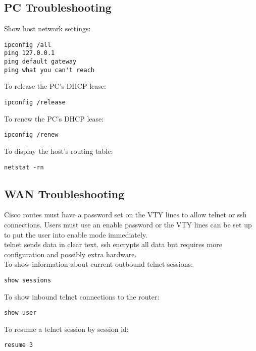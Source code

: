 \subsection{PC Troubleshooting}

Show host network settings:

\begin{verbatim}
ipconfig /all
ping 127.0.0.1
ping default gateway
ping what you can't reach
\end{verbatim}

To release the PC's DHCP lease:

\begin{verbatim}
ipconfig /release
\end{verbatim}

To renew the PC's DHCP lease:

\begin{verbatim}
ipconfig /renew
\end{verbatim}

To display the host's routing table:

\begin{verbatim}
netstat -rn
\end{verbatim}

\subsection{WAN Troubleshooting}

Cisco routes must have a password set on the VTY lines to allow telnet or
ssh connections. Users must use an enable password or the VTY lines can be
set up to put the user into enable mode immediately.\\

telnet sends data in clear text. ssh encrypts all data but requires more
configuration and possibly extra hardware.\\

To show information about current outbound telnet sessions:

\begin{verbatim}
show sessions
\end{verbatim}

To show inbound telnet connections to the router:

\begin{verbatim}
show user
\end{verbatim}

To resume a telnet session by session id:

\begin{verbatim}
resume 3
\end{verbatim}

